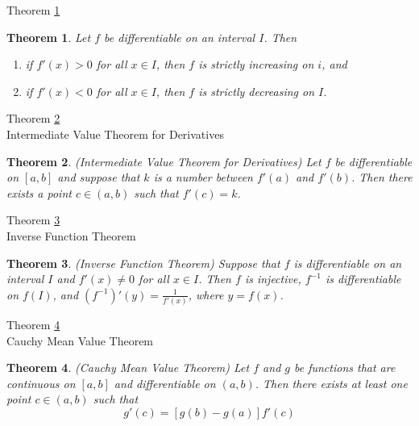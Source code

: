 \documentclass[avery5371,grid]{flashcards}
\newtheorem{theorem}{Theorem}
\begin{document}
\begin{flashcard}[Theorem]{Theorem \ref{thm87}}
\begin{theorem}
\label{thm87}
Let $f$ be differentiable on an interval $I$.  Then	
\begin{enumerate}
\item[(a)]  if $f'(x) > 0$ for all $x \in I$, then $f$ is
strictly increasing on $i$, and 
\item[(b)]  if $f'(x) < 0$ for all $x \in I$, then $f$ is
strictly decreasing on $I$.
\end{enumerate}
\end{theorem}
\end{flashcard}

\begin{flashcard}[Theorem]{Theorem \ref{thm88}\\
Intermediate Value Theorem for Derivatives}
\begin{theorem}
\label{thm88}
(Intermediate Value Theorem for Derivatives)  Let $f$ be differentiable
on $[a,b]$ and suppose that $k$ is a number between $f'(a)$ and $f'(b)$.
Then there exists a point $c \in (a,b)$ such that $f'(c) = k$.
\end{theorem}
\end{flashcard}

\begin{flashcard}[Theorem]{Theorem \ref{thm89}\\ 
Inverse Function Theorem}
\begin{theorem}
\label{thm89}
(Inverse Function Theorem)  Suppose that $f$ is differentiable on an
interval $I$ and $f'(x) \not= 0$ for all $x \in I$.  Then $f$ is
injective, $f^{-1}$ is differentiable on $f(I)$, and $(f^{-1})'(y) =
\frac{1}{f'(x)}$, where $y = f(x)$.
\end{theorem}
\end{flashcard}

\begin{flashcard}[Theorem]{Theorem \ref{thm90}\\
Cauchy Mean Value Theorem}
\begin{theorem}
\label{thm90}
(Cauchy Mean Value Theorem)  Let $f$ and $g$ be functions that are
continuous on $[a,b]$ and differentiable on $(a,b)$.  Then there exists
at least one point $c \in (a,b)$ such that
\begin{equation*}
[f(b) - f(a)]g'(c) = [g(b) - g(a)]f'(c)
\end{equation*}
\end{theorem}
\end{flashcard}
\end{document}
